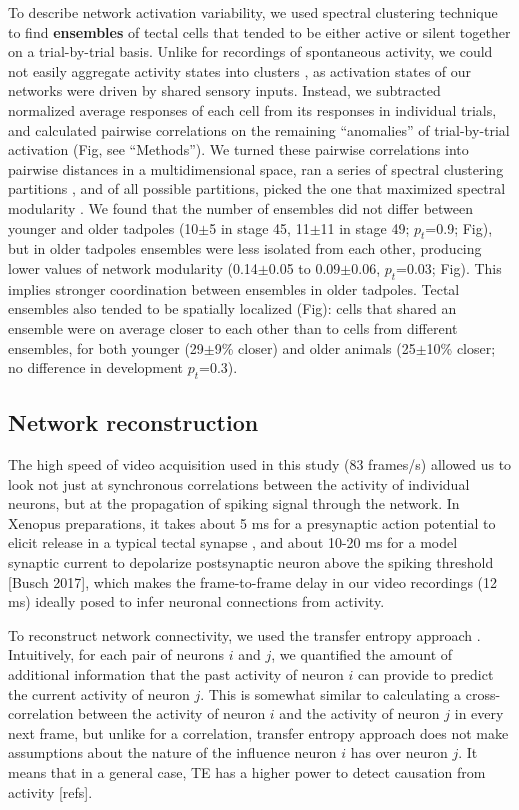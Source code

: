 \documentclass{article}
\begin{document}
To describe network activation variability, we used spectral clustering technique to find \textbf{ensembles} of tectal cells that tended to be either active or silent together on a trial-by-trial basis. Unlike for recordings of spontaneous activity, we could not easily aggregate activity states into clusters \citep{avitan2017spontaneous}, as activation states of our networks were driven by shared sensory inputs. Instead, we subtracted normalized average responses of each cell from its responses in individual trials, and calculated pairwise correlations on the remaining “anomalies” of trial-by-trial activation (Fig, see “Methods”). We turned these pairwise correlations into pairwise distances in a multidimensional space, ran a series of spectral clustering partitions \citep{ng2002spectral}, and of all possible partitions, picked the one that maximized spectral modularity \citep{newman2006modularity,gomez2009community}. We found that the number of ensembles did not differ between younger and older tadpoles (10$\pm$5 in stage 45, 11$\pm$11 in stage 49; $p_t$=0.9; Fig), but in older tadpoles ensembles were less isolated from each other, producing lower values of network modularity (0.14$\pm$0.05 to 0.09$\pm$0.06, $p_t$=0.03; Fig). This implies stronger coordination between ensembles in older tadpoles. Tectal ensembles also tended to be spatially localized (Fig): cells that shared an ensemble were on average closer to each other than to cells from different ensembles, for both younger (29$\pm$9\% closer) and older animals (25$\pm$10\% closer; no difference in development $p_t$=0.3).

\subsection*{Network reconstruction}

The high speed of video acquisition used in this study (83 frames/s) allowed us to look not just at synchronous correlations between the activity of individual neurons, but at the propagation of spiking signal through the network. In Xenopus preparations, it takes about 5 ms for a presynaptic action potential to elicit release in a typical tectal synapse \citep{khakhalin2012,ciarleglio2015}, and about 10-20 ms for a model synaptic current to depolarize postsynaptic neuron above the spiking threshold \citep{ciarleglio2015}[Busch 2017], which makes the frame-to-frame delay in our video recordings (12 ms) ideally posed to infer neuronal connections from activity.

To reconstruct network connectivity, we used the transfer entropy approach \citep{gourevitch2007te,stetter2012te}. Intuitively, for each pair of neurons $i$ and $j$, we quantified the amount of additional information that the past activity of neuron $i$ can provide to predict the current activity of neuron $j$. This is somewhat similar to calculating a cross-correlation between the activity of neuron $i$ and the activity of neuron $j$ in every next frame, but unlike for a correlation, transfer entropy approach does not make assumptions about the nature of the influence neuron $i$ has over neuron $j$. It means that in a general case, TE has a higher power to detect causation from activity \citep{stetter2012te}[refs].
\end{document}
